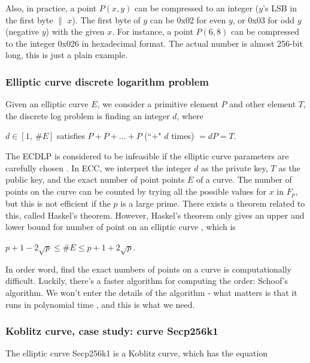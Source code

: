 Also, in practice, a point $P(x,y)$ can be compressed to an integer ($y$’s LSB in the first byte $\|$  $x$). The first byte of $y$ can be 0x02 for even $y$, or 0x03 for odd $y$ (negative $y$) with the given $x$. For instance, a point $P(6, 8)$ can be compressed to the integer 0x026 in hexadecimal format. The actual number is almost 256-bit long, this is just a plain example.

\subsubsection{Elliptic curve discrete logarithm problem}

Given an elliptic curve $E$, we consider a primitive element $P$ and other element $T$, the discrete log problem is finding an integer $d$, where
\begin{center}

$d \in [1, \ \#E]$ satisfies $P + P + \dotso + P$ (``+" $d$ times) $= dP = T$.
\end{center}

The ECDLP is considered to be infeasible if the elliptic curve parameters are carefully chosen \cite{DBLP:journals/iacr/BosCLN14}. In ECC, we interpret the integer $d$ as the private key, $T$ as the public key, and the exact number of point points $E$ of a curve. The number of points on the curve can be counted by trying all the possible values for $x$ in $F_p$, but this is not efficient if the $p$ is a large prime. There exists a theorem related to this, called Haskel’s theorem. However, Haskel’s theorem only gives an upper and lower bound for number of point on an elliptic curve \cite{DBLP:journals/iacr/BosCLN14}, which is

\begin{center}
  $p+1-2\sqrt{p} \leq \#E \leq p+1+2\sqrt{p}$.
\end{center}

In order word, find the exact numbers of points on a curve is computationally difficult. Luckily, there's a faster algorithm for computing the order: Schoof's algorithm. We won't enter the details of the algorithm - what matters is that it runs in polynomial time \cite{Schoof}, and this is what we need.

\subsubsection{Koblitz curve, case study: curve Secp256k1}
The elliptic curve Secp256k1 is a Koblitz curve, which has the equation


